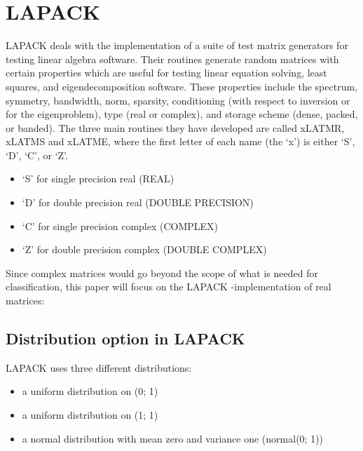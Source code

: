 \documentclass[a4paper]{article}
\begin{document}
\section{LAPACK}
LAPACK deals with the implementation of a suite of test matrix generators for testing linear algebra software. Their routines generate random matrices with certain properties which are useful for testing linear equation solving, least squares, and eigendecomposition software. These properties include the spectrum, symmetry, bandwidth, norm, sparsity, conditioning  (with respect to inversion or for the eigenproblem), type (real or complex), and storage scheme (dense, packed, or banded).
The three main routines they have developed are called xLATMR, xLATMS and xLATME, where the first letter of each name (the `x') is either `S', `D', `C', or `Z'. 
\begin{itemize}
\item ‘S’ for single precision real (REAL)
\item ‘D’ for double precision real (DOUBLE PRECISION)
\item ‘C’ for single precision complex (COMPLEX)
\item ‘Z’ for double precision complex (DOUBLE COMPLEX)
\end{itemize}
Since complex matrices would go beyond the scope of what is needed for classification, this paper will focus on the LAPACK -implementation of real matrices:

\subsection{Distribution option in LAPACK}
LAPACK uses three different distributions:
\begin{itemize}
\item a uniform distribution on (0; 1)
\item a uniform distribution on (1; 1)
\item a normal distribution with mean zero and variance one (normal(0; 1))
\end{itemize}
\end{document}
